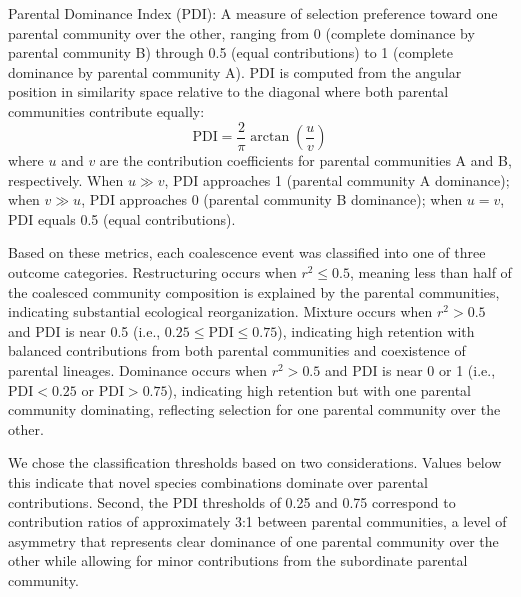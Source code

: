 Parental Dominance Index (PDI): A measure of selection preference toward one parental community over the other, ranging from 0 (complete dominance by parental community B) through 0.5 (equal contributions) to 1 (complete dominance by parental community A). PDI is computed from the angular position in similarity space relative to the diagonal where both parental communities contribute equally:
\begin{equation}
\text{PDI} = \frac{2}{\pi} \arctan\left(\frac{u}{v}\right)
\label{eq:pdi}
\end{equation}
where $u$ and $v$ are the contribution coefficients for parental communities A and B, respectively. When $u \gg v$, PDI approaches 1 (parental community A dominance); when $v \gg u$, PDI approaches 0 (parental community B dominance); when $u = v$, PDI equals 0.5 (equal contributions).

Based on these metrics, each coalescence event was classified into one of three outcome categories. Restructuring occurs when $r^2 \leq 0.5$,  meaning less than half of the coalesced community composition is explained by the parental communities, indicating substantial ecological reorganization. Mixture occurs when $r^2 > 0.5$ and PDI is near 0.5 (i.e., $0.25 \leq \text{PDI} \leq 0.75$), indicating high retention with balanced contributions from both parental communities and coexistence of parental lineages. Dominance occurs when $r^2 > 0.5$ and PDI is near 0 or 1 (i.e., $\text{PDI} < 0.25$ or $\text{PDI} > 0.75$), indicating high retention but with one parental community dominating, reflecting selection for one parental community over the other.

We chose the classification thresholds based on two considerations.  Values below this indicate that novel species combinations dominate over parental contributions. Second, the PDI thresholds of 0.25 and 0.75 correspond to contribution ratios of approximately 3:1 between parental communities, a level of asymmetry that represents clear dominance of one parental community over the other while allowing for minor contributions from the subordinate parental community.

